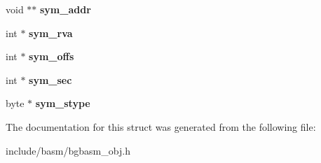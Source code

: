 \begin{DoxyCompactItemize}
\item 
\hypertarget{structBASM__PE__Info__s_a263d97b08295f1113778a199c219c90e}{void $\ast$$\ast$ {\bfseries sym\-\_\-addr}}\label{structBASM__PE__Info__s_a263d97b08295f1113778a199c219c90e}

\item 
\hypertarget{structBASM__PE__Info__s_aafcc75316cff22cff39973ec383b9465}{int $\ast$ {\bfseries sym\-\_\-rva}}\label{structBASM__PE__Info__s_aafcc75316cff22cff39973ec383b9465}

\item 
\hypertarget{structBASM__PE__Info__s_a19b9c5d31c25b28587708d3f0ced79df}{int $\ast$ {\bfseries sym\-\_\-offs}}\label{structBASM__PE__Info__s_a19b9c5d31c25b28587708d3f0ced79df}

\item 
\hypertarget{structBASM__PE__Info__s_a8b6765c2b25b877bdb5e02999ece7154}{int $\ast$ {\bfseries sym\-\_\-sec}}\label{structBASM__PE__Info__s_a8b6765c2b25b877bdb5e02999ece7154}

\item 
\hypertarget{structBASM__PE__Info__s_ae1a763cbc772941fa475c9ee2d034386}{byte $\ast$ {\bfseries sym\-\_\-stype}}\label{structBASM__PE__Info__s_ae1a763cbc772941fa475c9ee2d034386}

\end{DoxyCompactItemize}


The documentation for this struct was generated from the following file\-:\begin{DoxyCompactItemize}
\item 
include/basm/bgbasm\-\_\-obj.\-h\end{DoxyCompactItemize}
